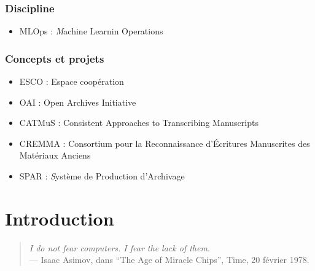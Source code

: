 \documentclass[a4paper,12pt,twoside]{book}
\begin{document}
\subsection*{Discipline}

\begin{itemize}
	\item MLOps : \textit Machine Learnin Operations
\end{itemize}

\subsection*{Concepts  et projets }

\begin{itemize}
	\item ESCO : Espace coopération
	\item OAI : Open Archives Initiative
	\item CATMuS :  Consistent Approaches to Transcribing Manuscripts
	\item CREMMA : Consortium pour la Reconnaissance d’Écritures Manuscrites des Matériaux Anciens
	\item SPAR : \textit Système de Production d'Archivage
\end{itemize}

\newpage{\pagestyle{empty}\cleardoublepage}
	

\printbibliography

	
\chapter{Introduction}	
\begin{quotation}
	\textit{ I do not fear computers. I fear the lack of them}. \\
	— Isaac Asimov, dans “The Age of Miracle Chips”, Time, 20 février 1978.
\end{quotation}
\bigbreak
\end{document}

